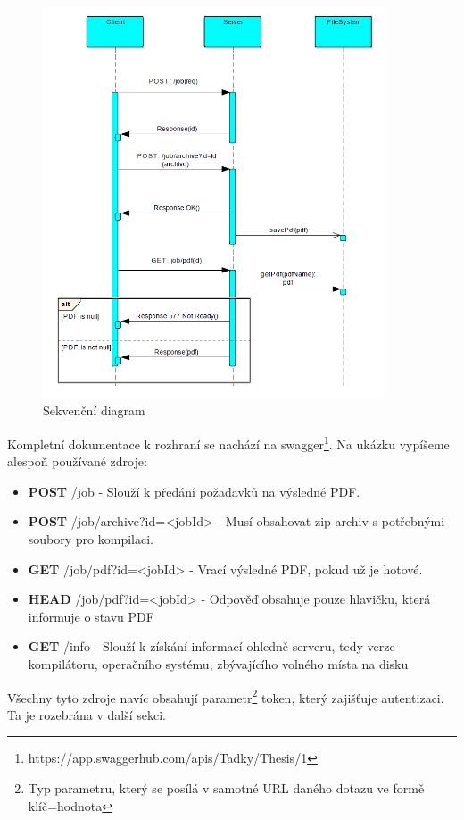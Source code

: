 \begin{figure}[H]
	\includegraphics[width=0.9\textwidth]{diagram}
	\centering
	\caption{Sekvenční diagram}
	\label{fig:seq}
\end{figure}

Kompletní dokumentace k rozhraní se nachází na swagger\footnote{https://app.swaggerhub.com/apis/Tadky/Thesis/1}. Na ukázku vypíšeme alespoň používané zdroje:
\begin{itemize}
	\item \textbf{POST} {\ttfamily /job} - Slouží k předání požadavků na výsledné PDF.
	\item \textbf{POST} {\ttfamily /job/archive?id=<jobId>} - Musí obsahovat zip archiv s potřebnými soubory pro kompilaci.
	\item \textbf{GET} {\ttfamily /job/pdf?id=<jobId>} - Vrací výsledné PDF, pokud už je hotové.
	\item \textbf{HEAD} {\ttfamily /job/pdf?id=<jobId>} - Odpověď obsahuje pouze hlavičku, která informuje o stavu PDF
	\item \textbf{GET} {\ttfamily /info} - Slouží k získání informací ohledně serveru, tedy verze kompilátoru, operačního systému, zbývajícího volného místa na disku
\end{itemize}
Všechny tyto zdroje navíc obsahují parametr\footnote{Typ parametru, který se posílá v samotné URL daného dotazu ve formě klíč=hodnota} token, který zajišťuje autentizaci. Ta je rozebrána v další sekci.

